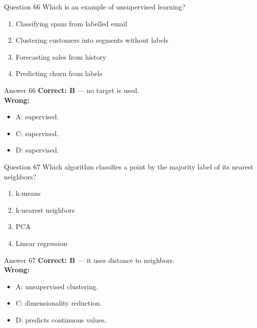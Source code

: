 \documentclass[aspectratio=169,11pt]{beamer}
\begin{document}
\begin{frame}{Question 66}
Which is an example of unsupervised learning?
\begin{enumerate}[label=\Alph*.]
\item Classifying spam from labelled email
\item Clustering customers into segments without labels
\item Forecasting sales from history
\item Predicting churn from labels
\end{enumerate}
\end{frame}
\begin{frame}{Answer 66}
\textbf{Correct: B} --- no target is used.\\
\vspace{0.5em}
\textbf{Wrong:}
\begin{itemize}
\item A: supervised.
\item C: supervised.
\item D: supervised.
\end{itemize}
\end{frame}

\begin{frame}{Question 67}
Which algorithm classifies a point by the majority label of its nearest neighbors?
\begin{enumerate}[label=\Alph*.]
\item k-means
\item k-nearest neighbors
\item PCA
\item Linear regression
\end{enumerate}
\end{frame}
\begin{frame}{Answer 67}
\textbf{Correct: B} --- it uses distance to neighbors.\\
\vspace{0.5em}
\textbf{Wrong:}
\begin{itemize}
\item A: unsupervised clustering.
\item C: dimensionality reduction.
\item D: predicts continuous values.
\end{itemize}
\end{frame}
\end{document}
